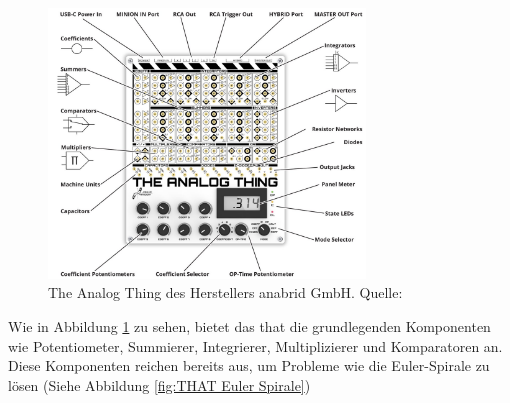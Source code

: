 \begin{figure}[h]
  \includegraphics[width=0.75\textwidth]{abbildungen/the_analog_thing.jpg}
  \caption{The Analog Thing des Herstellers anabrid GmbH. Quelle: \cite{TheAnalogThingDocs}}
  \label{fig:The Analog Thing}
\end{figure}

Wie in Abbildung \ref{fig:The Analog Thing} zu sehen, bietet das \ac{that} die grundlegenden Komponenten wie Potentiometer, Summierer, Integrierer, Multiplizierer und Komparatoren an. Diese Komponenten reichen bereits aus, um Probleme wie die Euler-Spirale zu lösen (Siehe Abbildung \ref{fig:THAT Euler Spirale})

